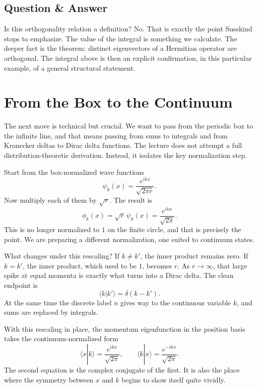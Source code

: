 \subsection{Question \& Answer}

Is this orthogonality relation a definition? No. That is exactly the point Susskind stops to emphasize. The value of the integral is something we calculate. The deeper fact is the theorem: distinct eigenvectors of a Hermitian operator are orthogonal. The integral above is then an explicit confirmation, in this particular example, of a general structural statement.

\section{From the Box to the Continuum}

The next move is technical but crucial. We want to pass from the periodic box to the infinite line, and that means passing from sums to integrals and from Kronecker deltas to Dirac delta functions. The lecture does not attempt a full distribution-theoretic derivation. Instead, it isolates the key normalization step.

Start from the box-normalized wave functions
\begin{equation}
\psi_k(x)=\frac{e^{ikx}}{\sqrt{2\pi r}}.
\end{equation}
Now multiply each of them by \(\sqrt{r}\). The result is
\begin{equation}
\phi_k(x)=\sqrt{r}\,\psi_k(x)=\frac{e^{ikx}}{\sqrt{2\pi}}.
\end{equation}
This is no longer normalized to \(1\) on the finite circle, and that is precisely the point. We are preparing a different normalization, one suited to continuum states.

What changes under this rescaling? If \(k\neq k'\), the inner product remains zero. If \(k=k'\), the inner product, which used to be \(1\), becomes \(r\). As \(r\to\infty\), that large spike at equal momenta is exactly what turns into a Dirac delta. The clean endpoint is
\begin{equation}
\langle k|k'\rangle = \delta(k-k').
\end{equation}
At the same time the discrete label \(n\) gives way to the continuous variable \(k\), and sums are replaced by integrals.

With this rescaling in place, the momentum eigenfunction in the position basis takes the continuum-normalized form
\begin{equation}
\langle x|k\rangle=\frac{e^{ikx}}{\sqrt{2\pi}},
\qquad
\langle k|x\rangle=\frac{e^{-ikx}}{\sqrt{2\pi}}.
\end{equation}
The second equation is the complex conjugate of the first. It is also the place where the symmetry between \(x\) and \(k\) begins to show itself quite vividly.


